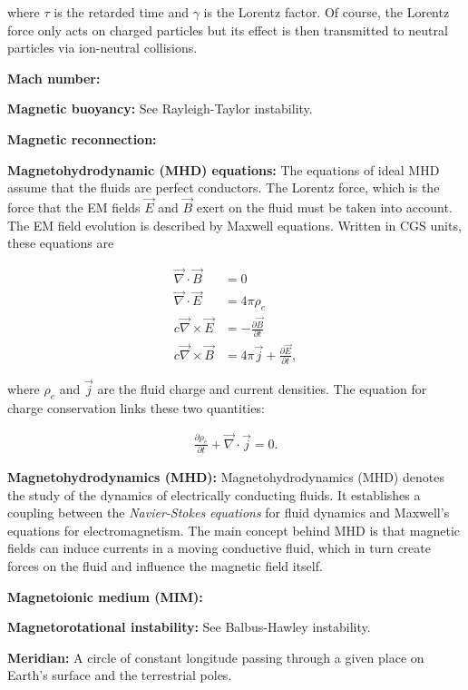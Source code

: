 \documentclass[a4paper,10pt]{article}
\begin{document}
{\noindent}where $\tau$ is the retarded time and $\gamma$ is the Lorentz factor. Of course, the Lorentz force only acts on charged particles but its effect is then transmitted to neutral particles via ion-neutral collisions.

{\noindent}\textbf{Mach number:}

{\noindent}\textbf{Magnetic buoyancy:} See Rayleigh-Taylor instability.

{\noindent}\textbf{Magnetic reconnection:}

{\noindent}\textbf{Magnetohydrodynamic (MHD) equations:} The equations of ideal MHD assume that the fluids are perfect conductors. The Lorentz force, which is the force that the EM fields $\vec{E}$ and $\vec{B}$ exert on the fluid must be taken into account. The EM field evolution is described by Maxwell equations. Written in CGS units, these equations are

\begin{align*}
    \vec\nabla\cdot\vec{B} &= 0 \\
    \vec\nabla\cdot\vec{E} &= 4\pi\rho_e \\
    c\vec\nabla\times\vec{E} &= - \frac{\partial\vec{B}}{\partial t} \\
    c\vec\nabla\times\vec{B} &= 4\pi\vec{j} + \frac{\partial\vec{E}}{\partial t},
\end{align*}

{\noindent}where $\rho_e$ and $\vec{j}$ are the fluid charge and current densities. The equation for charge conservation links these two quantities:

\begin{align*}
    \frac{\partial\rho_e}{\partial t} + \vec\nabla\cdot\vec{j} = 0.
\end{align*}

{\noindent}\textbf{Magnetohydrodynamics (MHD):} Magnetohydrodynamics (MHD) denotes the study of the dynamics of electrically conducting fluids. It establishes a coupling between the \textit{Navier-Stokes equations} for fluid dynamics and Maxwell's equations for electromagnetism. The main concept behind MHD is that magnetic fields can induce currents in a moving conductive fluid, which in turn create forces on the fluid and influence the magnetic field itself. 

{\noindent}\textbf{Magnetoionic medium (MIM):}

{\noindent}\textbf{Magnetorotational instability:} See Balbus-Hawley instability.

{\noindent}\textbf{Meridian:} A circle of constant longitude passing through a given place on Earth's surface and the terrestrial poles.
\end{document}
